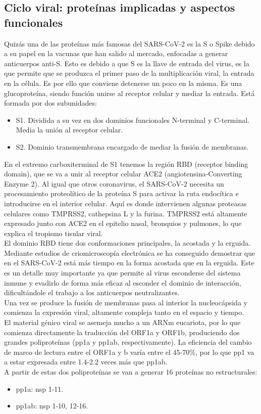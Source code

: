 \documentclass[a4paper,11pt]{report}
\begin{document}
 \subsection{Ciclo viral: proteínas implicadas y aspectos funcionales}
 Quizás una de las proteínas más famosas del SARS-CoV-2 es la S o Spike debido a su papel en la vacunas que han salido al mercado, enfocadas a generar anticuerpos anti-S. Esto es debido a que S es la llave de entrada del virus, es la que permite que se produzca el primer paso de la multiplicación viral, la entrada en la célula. Es por ello que conviene detenerse un poco en la misma. Es una glucoproteína, siendo función unirse al receptor celular y mediar la entrada.
  Está formada por dos subunidades:
  \begin{itemize}
  	\item S1. Dividida a su vez en dos dominios funcionales N-terminal y C-terminal. Media la unión al receptor celular.
  	\item S2. Dominio transmembrana encargado de mediar la fusión de membranas.	
  \end{itemize}
En el extremo carboxiterminal de S1 tenemos la región RBD (receptor binding domain), que se va a unir al receptor celular ACE2 (angiotensina-Converting Enzyme 2). Al igual que otros coronavirus, el SARS-CoV-2 necesita un procesamiento proteolítico de la proteína S para activar la ruta endocítica e introducirse en el interior celular. Aquí es donde intervienen algunas proteasas celulares como TMPRSS2, cathepsina L y la furina. TMPRSS2 está altamente expresado junto con ACE2 en el epitelio nasal, bronquios y pulmones, lo que explica el tropismo tisular viral.\cite{natu}\\

 El dominio RBD tiene dos conformaciones principales, la acostada y la erguida. Mediante estudios de criomicroscopía electrónica se ha conseguido demostrar que en el SARS-CoV-2  está más tiempo en la forma acostada que en la erguida. Este es un detalle muy importante ya que permite al virus esconderse del sistema inmune y evadirlo de forma más eficaz al esconder el dominio de interacción, dificultándole el trabajo a los anticuerpos neutralizantes. \\

  Una vez se produce la fusión de membranas pasa al interior la nucleocápsida y comienza la expresión viral, altamente compleja tanto en el espacio y tiempo.
 \\El material génico viral se asemeja mucho a un ARNm eucariota, por lo que comienza directamente la traducción del ORF1a y ORF1b, produciendo dos grandes poliproteínas (pp1a y pp1ab, respectivamente). La eficiencia del cambio  de marco de lectura entre el ORF1a y b varía entre el 45-70\%, por lo que pp1 va a estar expresada entre 1.4-2.2 veces más que pp1ab.\\
 A partir de estas dos poliproteínas se van a generar 16 proteínas no estructurales:
 \begin{itemize}
 	\item pp1a:  nsp 1-11.
 	\item pp1ab: nsp 1-10, 12-16.
 \end{itemize}
\end{document}
